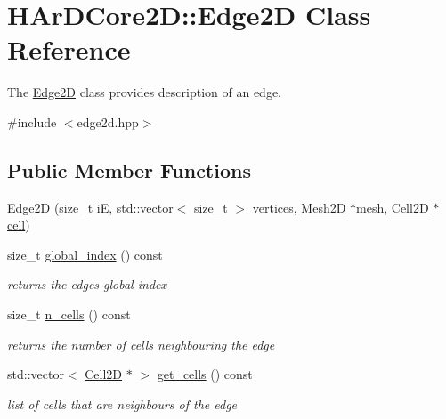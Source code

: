 \hypertarget{classHArDCore2D_1_1Edge2D}{}\section{H\+Ar\+D\+Core2D\+:\+:Edge2D Class Reference}
\label{classHArDCore2D_1_1Edge2D}


The \hyperlink{classHArDCore2D_1_1Edge2D}{Edge2D} class provides description of an edge.  




{\ttfamily \#include $<$edge2d.\+hpp$>$}

\subsection*{Public Member Functions}
\begin{DoxyCompactItemize}
\item 
\hyperlink{classHArDCore2D_1_1Edge2D_af3b982ed5bedc795c29e621a675a9137}{Edge2D} (size\+\_\+t iE, std\+::vector$<$ size\+\_\+t $>$ vertices, \hyperlink{classHArDCore2D_1_1Mesh2D}{Mesh2D} $\ast$mesh, \hyperlink{classHArDCore2D_1_1Cell2D}{Cell2D} $\ast$\hyperlink{classHArDCore2D_1_1Edge2D_aec9ba58af7a02bd31c4275edde79b5c6}{cell})
\item 
size\+\_\+t \hyperlink{group__Mesh2D_gaf8f93876f28049fbc97eccf27af2ccce}{global\+\_\+index} () const
\begin{DoxyCompactList}\small\item\em returns the edges global index \end{DoxyCompactList}\item 
size\+\_\+t \hyperlink{group__Mesh2D_ga99dda0dc4b6b35518d701a59a4a18bd5}{n\+\_\+cells} () const
\begin{DoxyCompactList}\small\item\em returns the number of cells neighbouring the edge \end{DoxyCompactList}\item 
\mbox{\label{classHArDCore2D_1_1Edge2D_a7a4eb7fa6572d552cd5056237d770bdf}} 
std\+::vector$<$ \hyperlink{classHArDCore2D_1_1Cell2D}{Cell2D} $\ast$ $>$ \hyperlink{classHArDCore2D_1_1Edge2D_a7a4eb7fa6572d552cd5056237d770bdf}{get\+\_\+cells} () const
\begin{DoxyCompactList}\small\item\em list of cells that are neighbours of the edge \end{DoxyCompactList}\item 

\end{DoxyCompactItemize}
